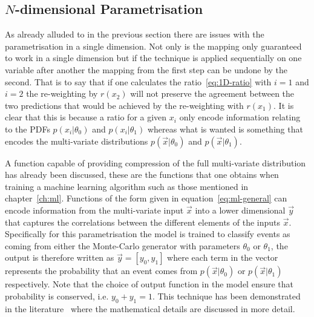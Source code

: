 \subsection{$N$-dimensional Parametrisation}
\label{sec:ND-reweight}

As already alluded to in the previous section there are issues with the
parametrisation in a single dimension. Not only is the mapping only guaranteed
to work in a single dimension but if the technique is applied sequentially on
one variable after another the mapping from the first step can be undone by the
second. That is to say that if one calculates the ratio~\ref{eq:1D-ratio} with
$i=1$ and $i=2$ the re-weighting by $r(x_2)$ will not preserve the agreement
between the two predictions that would be achieved by the re-weighting with
$r(x_1)$. It is clear that this is because a ratio for a given $x_i$ only encode
information relating to the PDFs $p(x_i|\theta_0)$ and $p(x_i|\theta_1)$ whereas
what is wanted is something that encodes the multi-variate distributions
$p(\vec{x}|\theta_0)$ and $p(\vec{x}|\theta_1)$.

A function capable of providing compression of the full multi-variate
distribution has already been discussed, these are the functions that one
obtains when training a machine learning algorithm such as those mentioned
in chapter~\ref{ch:ml}. Functions of the form given in
equation~\ref{eq:ml-general} can encode information from the multi-variate
input $\vec{x}$ into a lower dimensional $\vec{y}$ that captures the
correlations between the different elements of the inputs $\vec{x}$.
Specifically for this parametrisation the model is trained to classify events as
coming from either the Monte-Carlo generator with parameters $\theta_0$ or
$\theta_1$, the output is therefore written as $\vec{y} = [y_0, y_1]$ where each
term in the vector represents the probability that an event comes from
$p(\vec{x} | \theta_0)$ or $p(\vec{x} | \theta_1)$ respectively. Note that the
choice of output function in the model ensure that probability is conserved,
i.e. $y_0 + y_1 = 1$. This technique has been demonstrated in the
literature~\cite{cranmer2016approximating} where the mathematical details are
discussed in more detail.

